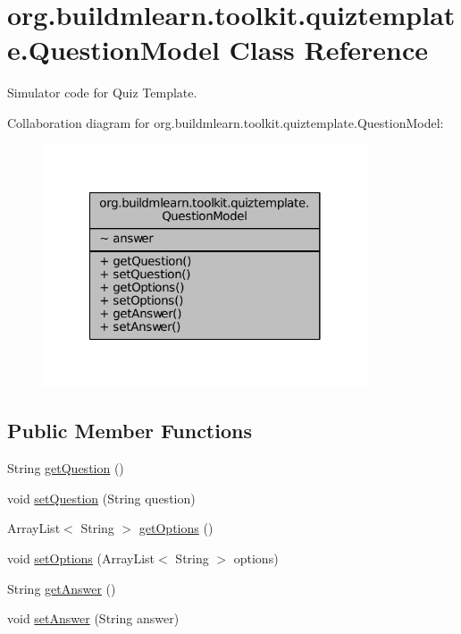 \hypertarget{classorg_1_1buildmlearn_1_1toolkit_1_1quiztemplate_1_1QuestionModel}{\section{org.\-buildmlearn.\-toolkit.\-quiztemplate.\-Question\-Model Class Reference}
\label{classorg_1_1buildmlearn_1_1toolkit_1_1quiztemplate_1_1QuestionModel}
}


Simulator code for Quiz Template.  




Collaboration diagram for org.\-buildmlearn.\-toolkit.\-quiztemplate.\-Question\-Model\-:
\nopagebreak
\begin{figure}[H]
\begin{center}
\leavevmode
\includegraphics[width=272pt]{de/d72/classorg_1_1buildmlearn_1_1toolkit_1_1quiztemplate_1_1QuestionModel__coll__graph}
\end{center}
\end{figure}
\subsection*{Public Member Functions}
\begin{DoxyCompactItemize}
\item 
String \hyperlink{classorg_1_1buildmlearn_1_1toolkit_1_1quiztemplate_1_1QuestionModel_a211748ba7b1d232d668fa1fd3975ed62}{get\-Question} ()
\item 
void \hyperlink{classorg_1_1buildmlearn_1_1toolkit_1_1quiztemplate_1_1QuestionModel_a0a50df9191920e3915fea7c8d84e09e6}{set\-Question} (String question)
\item 
Array\-List$<$ String $>$ \hyperlink{classorg_1_1buildmlearn_1_1toolkit_1_1quiztemplate_1_1QuestionModel_adbd602c1c583dcfc624490a2e5e05fb5}{get\-Options} ()
\item 
void \hyperlink{classorg_1_1buildmlearn_1_1toolkit_1_1quiztemplate_1_1QuestionModel_abd402bb5dc8fef15d86bca5bc6d2caca}{set\-Options} (Array\-List$<$ String $>$ options)
\item 
String \hyperlink{classorg_1_1buildmlearn_1_1toolkit_1_1quiztemplate_1_1QuestionModel_afa121b3d87ef30d77eecdfa0c350e3ab}{get\-Answer} ()
\item 
void \hyperlink{classorg_1_1buildmlearn_1_1toolkit_1_1quiztemplate_1_1QuestionModel_a544d3655038ac51e3867f56bc8985fb3}{set\-Answer} (String answer)
\end{DoxyCompactItemize}


